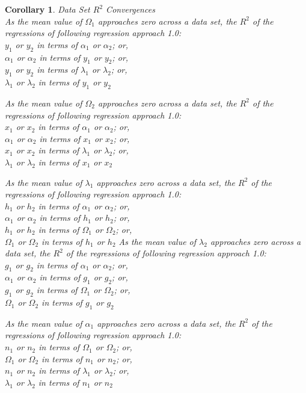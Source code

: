 \documentclass[preprint,13pt]{elsarticle}
\newtheorem{corollary}{Corollary}[theorem]
\begin{document}
\begin{corollary} Data Set $R^2$ Convergences\\
As the mean value of $\Omega_{1}$ approaches zero across a data set, the $R^2$ of the regressions of following regression approach 1.0:\\
$y_{1}$ or $y_{2}$ in terms of $\alpha_{1}$ or $\alpha_{2}$; or,\\
$\alpha_{1}$ or $\alpha_{2}$ in terms of $y_{1}$ or $y_{2}$; or,\\
$y_{1}$ or $y_{2}$ in terms of $\lambda_{1}$ or $\lambda_{2}$; or,\\
$\lambda_{1}$ or $\lambda_{2}$ in terms of $y_{1}$ or $y_{2}$

As the mean value of $\Omega_{2}$ approaches zero across a data set, the $R^2$ of the regressions of following regression approach 1.0:\\
$x_{1}$ or $x_{2}$ in terms of $\alpha_{1}$ or $\alpha_{2}$; or,\\
$\alpha_{1}$ or $\alpha_{2}$ in terms of $x_{1}$ or $x_{2}$; or,\\
$x_{1}$ or $x_{2}$ in terms of $\lambda_{1}$ or $\lambda_{2}$; or,\\
$\lambda_{1}$ or $\lambda_{2}$ in terms of $x_{1}$ or $x_{2}$

As the mean value of $\lambda_{1}$ approaches zero across a data set, the $R^2$ of the regressions of following regression approach 1.0:\\
$h_{1}$ or $h_{2}$ in terms of $\alpha_{1}$ or $\alpha_{2}$; or,\\
$\alpha_{1}$ or $\alpha_{2}$ in terms of $h_{1}$ or $h_{2}$; or,\\
$h_{1}$ or $h_{2}$ in terms of $\Omega_{1}$ or $\Omega_{2}$; or,\\
$\Omega_{1}$ or $\Omega_{2}$ in terms of $h_{1}$ or $h_{2}$
\newpage
As the mean value of $\lambda_{2}$ approaches zero across a data set, the $R^2$ of the regressions of following regression approach 1.0:\\
$g_{1}$ or $g_{2}$ in terms of $\alpha_{1}$ or $\alpha_{2}$; or,\\
$\alpha_{1}$ or $\alpha_{2}$ in terms of $g_{1}$ or $g_{2}$; or,\\
$g_{1}$ or $g_{2}$ in terms of $\Omega_{1}$ or $\Omega_{2}$; or,\\
$\Omega_{1}$ or $\Omega_{2}$ in terms of $g_{1}$ or $g_{2}$

As the mean value of $\alpha_{1}$ approaches zero across a data set, the $R^2$ of the regressions of following regression approach 1.0:\\
$n_{1}$ or $n_{2}$ in terms of $\Omega_{1}$ or $\Omega_{2}$; or,\\
$\Omega_{1}$ or $\Omega_{2}$ in terms of $n_{1}$ or $n_{2}$; or,\\
$n_{1}$ or $n_{2}$ in terms of $\lambda_{1}$ or $\lambda_{2}$; or,\\
$\lambda_{1}$ or $\lambda_{2}$ in terms of $n_{1}$ or $n_{2}$


\end{corollary}
\end{document}

